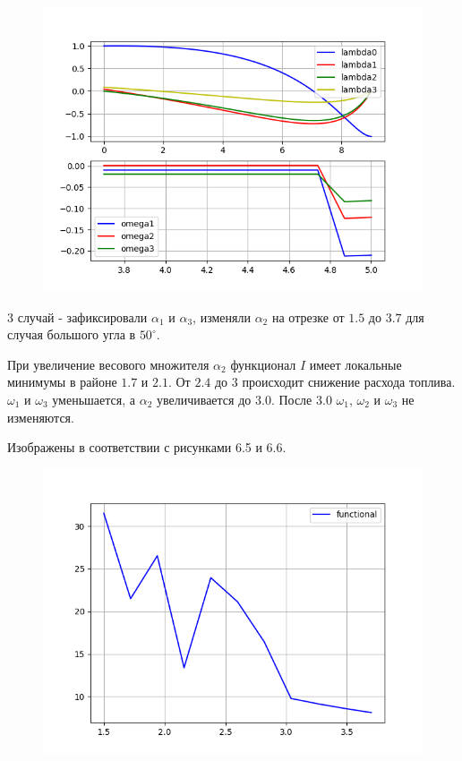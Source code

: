 \documentclass[14pt]{extreport}
\begin{document}
\begin{figure}[H]
\center\includegraphics[scale=0.8]{fig/ivp_and_control_3_7-5_5.png}
\caption{}
\end{figure}

3 случай - зафиксировали $\alpha_1$ и $\alpha_3$, изменяли $\alpha_2$ на отрезке от $1.5$ до $3.7$ для случая большого угла в $50^{\circ}$.

При увеличение весового множителя $\alpha_2$ функционал $I$ имеет локальные минимумы в районе $1.7$ и $2.1$. От $2.4$ до $3$ происходит снижение расхода топлива. $\omega_1$ и $\omega_3$ уменьшается, а $\alpha_2$ увеличивается до $3.0$. После $3.0$ $\omega_1$, $\omega_2$ и $\omega_3$ не изменяются.

Изображены в соответствии с рисунками 6.5 и 6.6.

\begin{figure}[H]
\center\includegraphics[scale=0.8]{fig/functional_alpha2_1_5-3_7_50.png}
\caption{}
\end{figure}
\end{document}
